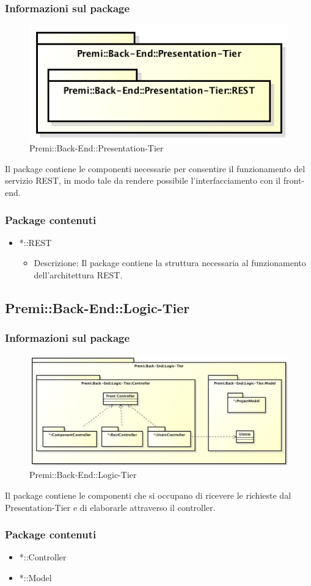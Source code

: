	\subsubsection{Informazioni sul package}
		\begin{figure}[h]
			\centering
			\includegraphics[width=0.7\linewidth]{img/back-end-package_presentation-tier}
			\caption[Premi::Back-End::Presentation-Tier]{Premi::Back-End::Presentation-Tier}
		\end{figure}
		Il package contiene le componenti necessarie per consentire il funzionamento del servizio REST, in modo tale da rendere possibile l'interfacciamento con il front-end.
		
	\subsubsection{Package contenuti}
		\begin{itemize}
			\item *::REST
			\begin{itemize}
				\item Descrizione: Il package contiene la struttura necessaria al funzionamento dell'architettura REST.
			\end{itemize}
		\end{itemize}
		
		
\subsection{Premi::Back-End::Logic-Tier}
	\subsubsection{Informazioni sul package}
	\begin{figure}[h]
		\centering
		\includegraphics[width=0.7\linewidth]{img/back-end-package_logic-tier}
		\caption[Premi::Back-End::Logic-Tier]{Premi::Back-End::Logic-Tier}
	\end{figure}
	Il package contiene le componenti che si occupano di ricevere le richieste dal Presentation-Tier e di elaborarle attraverso il controller.
	
	\subsubsection{Package contenuti}
	\begin{itemize}
		\item *::Controller
		\item *::Model
	\end{itemize}


